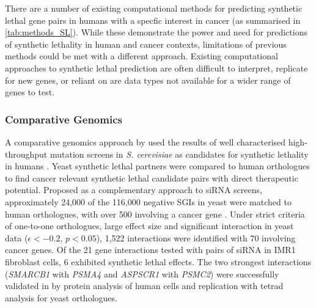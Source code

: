 There are a number of existing computational methods for predicting synthetic lethal gene pairs in humans with a specfic interest in cancer (as summarised in \ref{tab:methods_SL}). While these demonstrate the power and need for predictions of synthetic lethality in human and cancer contexts, limitations of previous methods could be met with a different approach. Existing computational approaches to synthetic lethal prediction are often difficult to interpret, replicate for new genes, or reliant on are data types not available for a wider range of genes to test.  

\subsubsection{Comparative Genomics}

A comparative genomics approach by \citet{Deshpande2013} used the results of well characterised high-throughput mutation screens in \textit{S. cerevisiae} as candidates for synthetic lethality in humans \citep{Baryshnikova2010a, Costanzo2010, Costanzo2011, Tong2001, Tong2004}. Yeast synthetic lethal partners were compared to human orthologues to find cancer relevant synthetic lethal candidate pairs with direct therapeutic potential. Proposed as a complementary approach to siRNA screens, approximately 24,000 of the 116,000 negative SGIs in yeast \citep{Costanzo2011} were matched to human orthologues, with over 500 involving a cancer gene \citep{Futreal2004}. Under strict criteria of one-to-one orthologues, large effect size and significant interaction in yeast data ($\epsilon < -0.2$, $p < 0.05$), 1,522 interactions were identified with 70 involving cancer genes. Of the 21 gene interactions tested with pairs of siRNA in IMR1 fibroblast cells, 6 exhibited synthetic lethal effects. The two strongest interactions (\textit{SMARCB1} with \textit{PSMA4} and \textit{ASPSCR1} with \textit{PSMC2}) were successfully validated in by protein analysis of human cells and replication with tetrad analysis for yeast orthologues.

